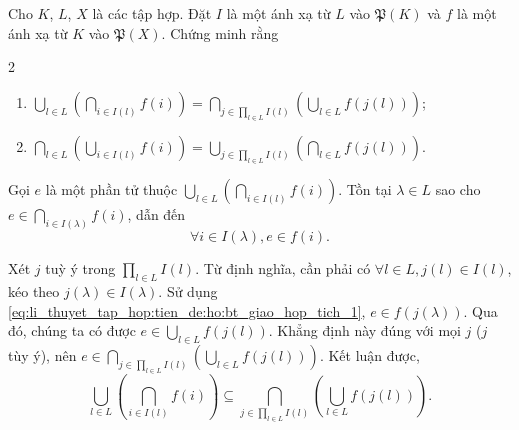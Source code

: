 \exercise Cho $K$, $L$, $X$ là các tập hợp. Đặt $I$ là một ánh xạ từ $L$ vào $\mathfrak{P}(K)$ và $f$ là một ánh xạ từ $K$ vào $\mathfrak{P}(X)$. Chứng minh rằng
\begin{multicols}{2}
   \begin{enumerate}
      \item $\displaystyle \bigcup_{l \in L} \left(\bigcap_{i \in I(l)} f(i)\right) = \bigcap_{j \in \prod_{l \in L} I(l)} \left(\bigcup_{l \in L} f(j(l))\right)$;
      \item $\displaystyle \bigcap_{l \in L} \left(\bigcup_{i \in I(l)} f(i)\right) = \bigcup_{j \in \prod_{l \in L} I(l)} \left(\bigcap_{l \in L} f(j(l))\right)$.
   \end{enumerate}
\end{multicols}
   
\solution

\resetSubexercise Gọi $e$ là một phần tử thuộc $\bigcup_{l \in L} \left(\bigcap_{i \in I(l)} f(i)\right)$. Tồn tại $\lambda \in L$ sao cho $e \in \bigcap_{i \in I(\lambda)}f(i)$, dẫn đến \begin{equation}
   \forall i \in I(\lambda), e \in f(i). 
   \label{eq:li_thuyet_tap_hop:tien_de:ho:bt_giao_hop_tich_1}
\end{equation}

Xét $j$ tuỳ ý trong $\prod_{l \in L}I(l)$. Từ định nghĩa, cần phải có $\forall l \in L, j(l) \in I(l)$, kéo theo $j(\lambda) \in I(\lambda)$. Sử dụng \eqref{eq:li_thuyet_tap_hop:tien_de:ho:bt_giao_hop_tich_1}, $e \in f(j(\lambda))$. Qua đó, chúng ta có được $e \in \bigcup_{l \in L} f(j(l))$. Khẳng định này đúng với mọi $j$ ($j$ tùy ý), nên $e \in \bigcap_{j \in \prod_{l \in L}I(l)} \left(\bigcup_{l \in L}f(j(l))\right)$. Kết luận được, $$
   \bigcup_{l \in L}\left(\bigcap_{i \in I(l)}f(i)\right) \subseteq \bigcap_{j \in \prod_{l \in L}I(l)} \left(\bigcup_{l \in L}f(j(l))\right). 
$$

\setcounter{exercise}{0}

